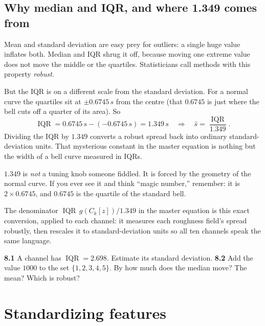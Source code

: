 \documentclass[11pt,oneside]{book}
\begin{document}
\section{Why median and IQR, and where 1.349 comes from}
Mean and standard deviation are easy prey for outliers: a single huge value inflates
both. Median and IQR shrug it off, because moving one extreme value does not move the
middle or the quartiles. Statisticians call methods with this property \emph{robust}.

But the IQR is on a different scale from the standard deviation. For a normal curve the
quartiles sit at $\pm0.6745\,s$ from the centre (that $0.6745$ is just where the bell
cuts off a quarter of its area). So
\begin{equation}
\operatorname{IQR}=0.6745\,s-(-0.6745\,s)=1.349\,s
\quad\Longrightarrow\quad
\hat s=\frac{\operatorname{IQR}}{1.349}.
\end{equation}
Dividing the IQR by $1.349$ converts a robust spread back into ordinary
standard-deviation units. That mysterious constant in the master equation is nothing
but the width of a bell curve measured in IQRs.

\begin{pitfall}
$1.349$ is \emph{not} a tuning knob someone fiddled. It is forced by the geometry of
the normal curve. If you ever see it and think ``magic number,'' remember: it is
$2\times0.6745$, and $0.6745$ is the quartile of the standard bell.
\end{pitfall}

\begin{hatibox}
The denominator $\operatorname{IQR}\,g(C_k[z])/1.349$ in the master equation is this
exact conversion, applied to each channel: it measures each roughness field's spread
robustly, then rescales it to standard-deviation units so all ten channels speak the
same language.
\end{hatibox}

\begin{practice}
\textbf{8.1} A channel has $\operatorname{IQR}=2.698$. Estimate its standard deviation.
\quad\textbf{8.2} Add the value $1000$ to the set $\{1,2,3,4,5\}$. By how much does the
median move? The mean? Which is robust?
\end{practice}

\chapter{Standardizing features}
\end{document}
